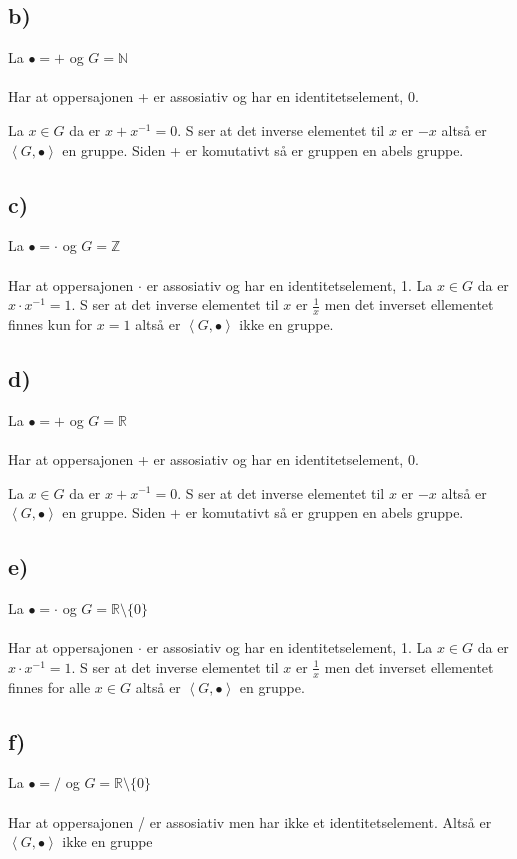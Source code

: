 \documentclass[a4paper, norsk, 10pt]{article}
\begin{document}
\begin{flushleft}
  \subsection*{b)}

  La $\bullet = +$ og $G = \mathbb{N}$ \\
  \ \\
  Har at oppersajonen + er assosiativ og har en identitetselement, 0.

  La $x \in G$ da er $x + x^{-1} = 0$. S ser at det inverse elementet til $x$ er $-x$ altså er $\left<G, \bullet \right>$ en gruppe. Siden + er komutativt så er gruppen en abels gruppe.


  
  \subsection*{c)}
  La $\bullet = \cdot$ og $G = \mathbb{Z}$ \\

  \ \\
  Har at oppersajonen $\cdot$ er assosiativ og har en identitetselement, 1.
  La $x \in G$ da er $x \cdot x^{-1} = 1$. S ser at det inverse elementet til $x$ er $\frac{1}{x}$ men det inverset ellementet finnes kun for $x= 1$ altså er $\left<G, \bullet \right>$ ikke en gruppe.  
  
  \subsection*{d)}
  La $\bullet = +$ og $G = \mathbb{R}$ \\
    \ \\
  Har at oppersajonen + er assosiativ og har en identitetselement, 0.

  La $x \in G$ da er $x + x^{-1} = 0$. S ser at det inverse elementet til $x$ er $-x$ altså er $\left<G, \bullet \right>$ en gruppe. Siden + er komutativt så er gruppen en abels gruppe.

  
  \subsection*{e)}
  La $\bullet = \cdot$ og $G = \mathbb{R} \setminus \{0\}$ \\

  \ \\
  Har at oppersajonen $\cdot$ er assosiativ og har en identitetselement, 1.
  La $x \in G$ da er $x \cdot x^{-1} = 1$. S ser at det inverse elementet til $x$ er $\frac{1}{x}$ men det inverset ellementet finnes for alle $x \in G$ altså er $\left<G, \bullet \right>$ en gruppe.  
  


  
  \subsection*{f)}
  La $\bullet = /$ og $G = \mathbb{R} \setminus \{0\}$ \\
  
  \ \\
  Har at oppersajonen / er assosiativ men har ikke et identitetselement. Altså er $\left<G, \bullet \right>$ ikke en gruppe    
  
\end{flushleft}
\end{document}
